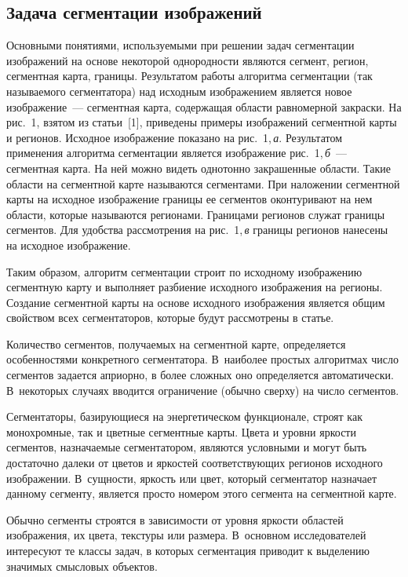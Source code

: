 \begin{multicols}{2}
  \vspace*{-6pt}
  
  \section{Задача сегментации изображений}
  
  Основными понятиями, используемыми при решении задач сегментации 
изображений на основе некоторой однородности являются сегмент, регион, 
сегментная карта, границы. Результатом работы алгоритма сегментации (так 
называемого сегментатора) над исходным изображением является новое 
изображение~--- сегментная карта, содержащая области равномерной закраски. 
На рис.~1, взятом из статьи~[1], приведены примеры изображений сегментной 
карты и регионов. Исходное изображение показано на рис.~1,\,\textit{а}. 
Результатом применения алгоритма сегментации является изображение 
рис.~1,\,\textit{б}~--- сегментная карта. На ней можно видеть однотонно 
закрашенные области. Такие области на сегментной карте называются 
сегментами. При наложении сегментной карты на исходное изображение 
границы ее сегментов оконтуривают на нем области, которые называются 
регионами. Границами регионов служат границы сегментов. Для удобства 
рассмотрения на рис.~1,\,\textit{в} границы регионов нанесены на исходное 
изображение.


  Таким образом, алгоритм сегментации строит по исходному изображению 
сегментную карту и выполняет разбиение исходного изображения на регионы. 
Создание сегментной карты на основе исходного изображения является общим 
свойством всех сегментаторов, которые будут рассмотрены в статье.
  
  Количество сегментов, получаемых на сегментной карте, определяется 
особенностями конкретного сегментатора. В~наиболее простых алгоритмах 
число сегментов задается априорно, в более сложных оно определяется 
автоматически. В~некоторых случаях вводится ограничение (обычно сверху) на 
число сегментов.
  
  Сегментаторы, базирующиеся на энергетическом функционале, строят как 
монохромные, так и цветные сегментные карты. Цвета и уровни яр\-кости 
сегментов, назначаемые сегментатором, являются условными и могут быть 
достаточно далеки от цветов и яркостей соответствующих регионов исходного 
изображении. В~сущности, яркость или цвет, который сегментатор назначает 
данному сегменту, является просто номером этого сегмента на сегментной 
карте.
  
  Обычно сегменты строятся в зависимости от уровня яркости областей 
изображения, их цвета, текстуры или размера. В~основном исследователей 
интересуют те классы задач, в которых сегментация приводит к выделению 
значимых смысловых объектов.


\end{multicols}
